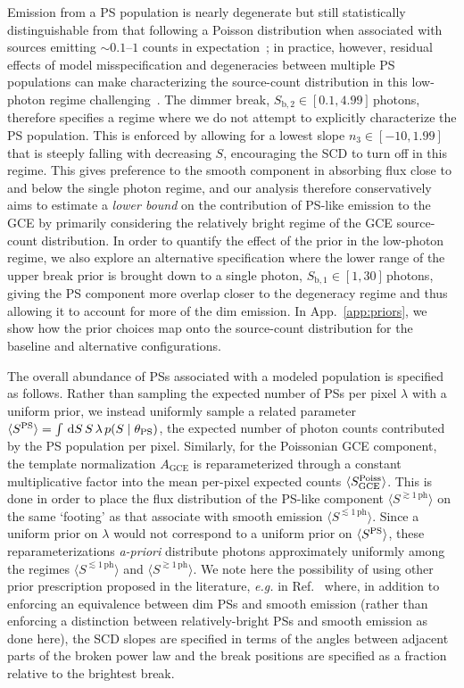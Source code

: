 \documentclass[prd,aps,10pt,nofootinbib,twocolumn,superscriptaddress,preprintnumbers,balancelastpage,longbibliography,floatfix]{revtex4-2}
\begin{document}
Emission from a PS population is nearly degenerate but still statistically distinguishable from that following a Poisson distribution when associated with sources emitting $\sim 0.1$--$1$ counts in expectation~\cite{List:2021aer}; in practice, however, residual effects of model misspecification and degeneracies between multiple PS populations can make characterizing the source-count distribution in this low-photon regime challenging~\cite{Chang:2019ars}. The dimmer break, $S_{\mathrm{b}, 2} \in  [0.1, 4.99]$\,photons, therefore specifies a regime where we do not attempt to explicitly characterize the PS population. This is enforced by allowing for a lowest slope $n_3 \in [-10, 1.99]$ that is steeply falling with decreasing $S$, encouraging the SCD to turn off in this regime. This gives preference to the smooth component in absorbing flux close to and below the single photon regime, and our analysis therefore conservatively aims to estimate a \emph{lower bound} on the contribution of PS-like emission to the GCE by primarily considering the relatively bright regime of the GCE source-count distribution. In order to quantify the effect of the prior in the low-photon regime, we also explore an alternative specification where the lower range of the upper break prior is brought down to a single photon, $S_{\mathrm{b}, 1}  \in  [1, 30]$\,photons, giving the PS component more overlap closer to the degeneracy regime and thus allowing it to account for more of the dim emission. In App.~\ref{app:priors}, we show how the prior choices map onto the source-count distribution for the baseline and alternative configurations.

The overall abundance of PSs associated with a modeled population is specified as follows. Rather than sampling the expected number of PSs per pixel $\lambda$ with a uniform prior, we instead uniformly sample a related parameter $\langle S^{\rm PS} \rangle = \int\,\mathrm{d} S\,S\,\lambda \, p(S\mid\theta_\mathrm{PS})$, the expected number of photon counts contributed by the PS population per pixel. Similarly, for the Poissonian GCE component, the template normalization $A_\mathrm{GCE}$ is reparameterized through a constant multiplicative factor into the mean per-pixel expected counts $\langle S^{\rm Poiss}_\mathrm{GCE} \rangle$. This is done in order to place the flux distribution of the PS-like component $\langle S^{\gtrsim 1\,\mathrm{ph}} \rangle$ on the same `footing' as that associate with smooth emission $\langle S^{\lesssim 1\,\mathrm{ph}} \rangle$. Since a uniform prior on $\lambda$ would not correspond to a uniform prior on $\langle S^{\rm PS} \rangle$, these reparameterizations \emph{a-priori} distribute photons approximately uniformly among the regimes $\langle S^{\lesssim 1\,\mathrm{ph}} \rangle$ and $\langle S^{\gtrsim 1\,\mathrm{ph}} \rangle$. We note here the possibility of using other prior prescription proposed in the literature, \emph{e.g.} in Ref.~\cite{Collin:2021ufc} where, in addition to enforcing an equivalence between dim PSs and smooth emission (rather than enforcing a distinction between relatively-bright PSs and smooth emission as done here), the SCD slopes are specified in terms of the angles between adjacent parts of the broken power law and the break positions are specified as a fraction relative to the brightest break.
\end{document}
